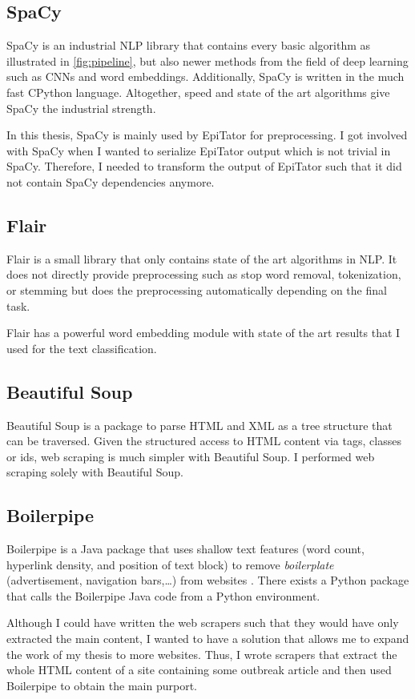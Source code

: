 \subsection{SpaCy}
SpaCy is an industrial NLP library that contains every basic algorithm as illustrated in \ref{fig:pipeline}, but also newer methods from the field of deep learning such as CNNs and word embeddings. Additionally, SpaCy is written in the much fast CPython language. Altogether, speed and state of the art algorithms give SpaCy the industrial strength.

In this thesis, SpaCy is mainly used by EpiTator for preprocessing. I got involved with SpaCy when I wanted to serialize EpiTator output which is not trivial in SpaCy. Therefore, I needed to transform the output of EpiTator such that it did not contain SpaCy dependencies anymore.

\subsection{Flair}
Flair is a small library that only contains state of the art algorithms in NLP. It does not directly provide preprocessing such as stop word removal, tokenization, or stemming but does the preprocessing automatically depending on the final task.

Flair has a powerful word embedding module with state of the art results that I used for the text classification.

\subsection{Beautiful Soup}
Beautiful Soup is a package to parse HTML and XML as a tree structure that can be traversed. Given the structured access to HTML content via tags, classes or ids, web scraping is much simpler with Beautiful Soup.
I performed web scraping solely with Beautiful Soup.

\subsection{Boilerpipe}
Boilerpipe is a Java package that uses shallow text features (word count, hyperlink density, and position of text block) to remove \textsl{boilerplate} (advertisement, navigation bars,\dots) from websites \citep{Kohlschutter2010}. There exists a Python package that calls the Boilerpipe Java code from a Python environment.

Although I could have written the web scrapers such that they would have only extracted the main content, I wanted to have a solution that allows me to expand the work of my thesis to more websites. Thus, I wrote scrapers that extract the whole HTML content of a site containing some outbreak article and then used Boilerpipe to obtain the main purport.

